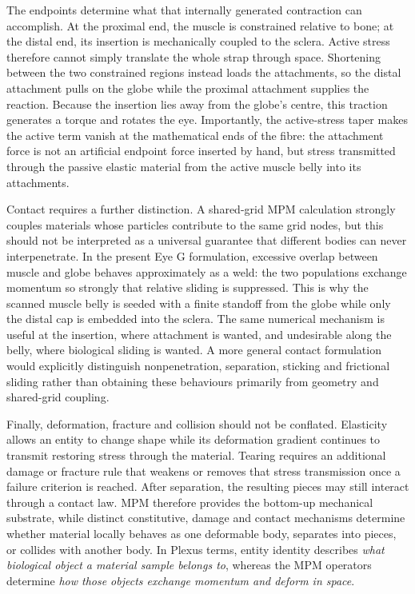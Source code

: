 \documentclass[11pt]{article}
\begin{document}
The endpoints determine what that internally generated contraction can accomplish. At the proximal end, the muscle is constrained relative to bone; at the distal end, its insertion is mechanically coupled to the sclera. Active stress therefore cannot simply translate the whole strap through space. Shortening between the two constrained regions instead loads the attachments, so the distal attachment pulls on the globe while the proximal attachment supplies the reaction. Because the insertion lies away from the globe's centre, this traction generates a torque and rotates the eye. Importantly, the active-stress taper makes the active term vanish at the mathematical ends of the fibre: the attachment force is not an artificial endpoint force inserted by hand, but stress transmitted through the passive elastic material from the active muscle belly into its attachments.

Contact requires a further distinction. A shared-grid MPM calculation strongly couples materials whose particles contribute to the same grid nodes, but this should not be interpreted as a universal guarantee that different bodies can never interpenetrate. In the present Eye G formulation, excessive overlap between muscle and globe behaves approximately as a weld: the two populations exchange momentum so strongly that relative sliding is suppressed. This is why the scanned muscle belly is seeded with a finite standoff from the globe while only the distal cap is embedded into the sclera. The same numerical mechanism is useful at the insertion, where attachment is wanted, and undesirable along the belly, where biological sliding is wanted. A more general contact formulation would explicitly distinguish nonpenetration, separation, sticking and frictional sliding rather than obtaining these behaviours primarily from geometry and shared-grid coupling.

Finally, deformation, fracture and collision should not be conflated. Elasticity allows an entity to change shape while its deformation gradient continues to transmit restoring stress through the material. Tearing requires an additional damage or fracture rule that weakens or removes that stress transmission once a failure criterion is reached. After separation, the resulting pieces may still interact through a contact law. MPM therefore provides the bottom-up mechanical substrate, while distinct constitutive, damage and contact mechanisms determine whether material locally behaves as one deformable body, separates into pieces, or collides with another body. In Plexus terms, entity identity describes \emph{what biological object a material sample belongs to}, whereas the MPM operators determine \emph{how those objects exchange momentum and deform in space}.
\end{document}
